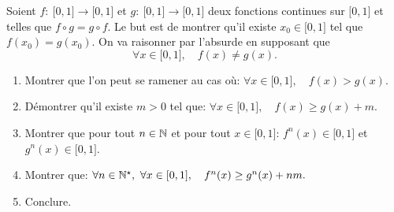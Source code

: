 \documentclass[a4paper, 11pt,reqno]{article}
\begin{document}
\begin{exercice}  \;
	Soient $f:\ \lbrack 0,1\rbrack\rightarrow \lbrack 0,1\rbrack$ et $g:\ \lbrack 0,1\rbrack\rightarrow \lbrack 0,1\rbrack$ deux fonctions continues sur $\lbrack 0,1\rbrack$ et telles que $f\circ g=g\circ f$. Le but est de montrer qu'il existe $x_0\in\lbrack 0,1\rbrack$ tel que $f(x_0)=g(x_0)$. On va raisonner par l'absurde en supposant que
	$$\forall x\in\lbrack 0,1\rbrack,\quad f(x)\not= g(x).$$
	\begin{enumerate}
		\item Montrer que l'on peut se ramener au cas o\`u: $\forall x\in\lbrack 0,1\rbrack,\quad f(x)>g(x).$
		\item D\'emontrer qu'il existe $m>0$ tel que: $\forall x\in\lbrack 0,1\rbrack,\quad f(x)\geq g(x)+m.$
		\item Montrer que pour tout $n\in\mathbb{N}$ et pour tout $x\in\lbrack 0,1\rbrack$: $f^n(x)\in\lbrack 0,1\rbrack$ et $g^n(x)\in\lbrack 0,1\rbrack$.
		\item Montrer que: $\forall n\in\N^{\star},\ \forall x\in\lbrack 0,1\rbrack,\quad f^n(x)\geq g^n(x)+nm.$
		\item Conclure.
	\end{enumerate}
\end{exercice}
\end{document}
